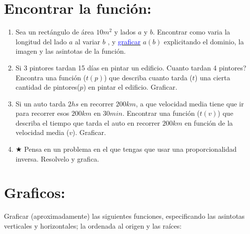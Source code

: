 \documentclass[a4paper,11pt,spanish,sans]{exam}
\begin{document}
\section{Encontrar la función:}
\begin{enumerate}
\item Sea un rectángulo de área $10m^2$  y lados $a$ y $b$. Encontrar como varia la longitud del lado $a$ al variar $b$ , y \href{https://tube.geogebra.org/m/1465885}{\textcolor{blue}{graficar}} $a(b)$ explicitando el dominio, la imagen y las asintotas de la función.
\item Si 3 pintores tardan 15 días en pintar un edificio. Cuanto tardan 4 pintores? 
Encontra una función ($t(p)$) que describa cuanto tarda ($t$) una cierta cantidad de pintores($p$) en pintar el edificio. Graficar.
\item Si un auto  tarda $2hs$ en recorrer $200km$, a que velocidad media tiene que ir para recorrer esos $200km$ en $30min$. Encontrar una función ($t(v)$) que describa el tiempo que tarda el auto en recorrer $200km$ en función de la velocidad media ($v$). Graficar.


\item $\bigstar$ Pensa en un problema en el que tengas que usar una proporcionalidad inversa. Resolvelo y grafica.

\end{enumerate}


\section{Graficos:}
Graficar (aproximadamente) las siguientes funciones, especificando las asintotas verticales y horizontales; la ordenada al origen y las raíces:
\end{document}
